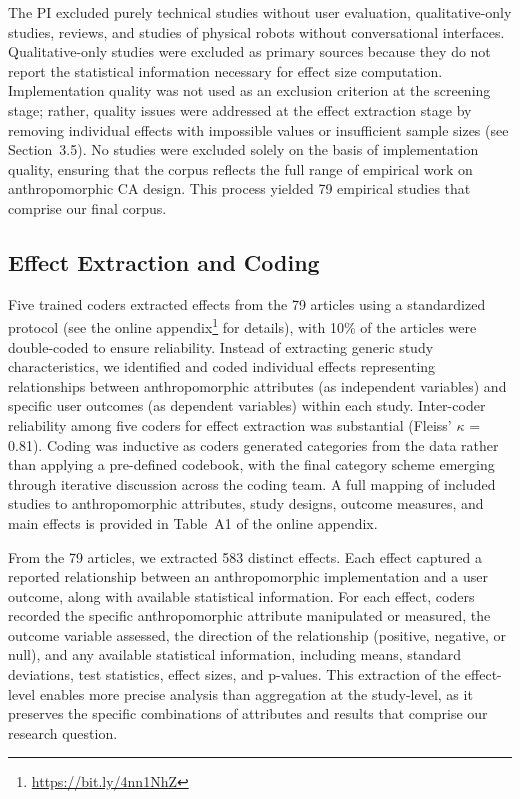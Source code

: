 \documentclass[lettersize,journal]{IEEEtran}
\begin{document}
The PI excluded purely technical studies without user evaluation, qualitative-only studies, reviews, and studies of physical robots without conversational interfaces. Qualitative-only studies were excluded as primary sources because they do not report the statistical information necessary for effect size computation.  Implementation quality was not used as an exclusion criterion at the screening stage; rather, quality issues were addressed at the effect extraction stage by removing individual effects with impossible values or insufficient sample sizes (see Section~3.5). No studies were excluded solely on the basis of implementation quality, ensuring that the corpus reflects the full range of empirical work on anthropomorphic CA design. This process yielded 79 empirical studies that comprise our final corpus.

\subsection{Effect Extraction and Coding}

Five trained coders extracted effects from the 79 articles using a standardized protocol (see the online appendix\footnote{\href{https://osf.io/7rj6f/overview?view_only=35b327583fee4222b5b336465107580c}{https://bit.ly/4nn1NhZ}} for details), with 10\% of the articles were double-coded to ensure reliability. Instead of extracting generic study characteristics, we identified and coded individual effects representing relationships between anthropomorphic attributes (as independent variables) and specific user outcomes (as dependent variables) within each study. Inter-coder reliability among five coders for effect extraction was substantial (Fleiss' $\kappa$ = 0.81). Coding was inductive as coders generated categories from the data rather than applying a pre-defined codebook, with the final category scheme emerging through iterative discussion across the coding team. A full mapping of included studies to anthropomorphic attributes, study designs, outcome measures, and main effects is provided in Table~A1 of the online appendix.

From the 79 articles, we extracted 583 distinct effects. Each effect captured a reported relationship between an anthropomorphic implementation and a user outcome, along with available statistical information. For each effect, coders recorded the specific anthropomorphic attribute manipulated or measured, the outcome variable assessed, the direction of the relationship (positive, negative, or null), and any available statistical information, including means, standard deviations, test statistics, effect sizes, and p-values. This extraction of the effect-level enables more precise analysis than aggregation at the study-level, as it preserves the specific combinations of attributes and results that comprise our research question.
\end{document}

